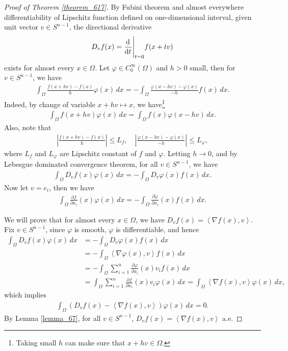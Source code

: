 \documentclass[11pt]{book}
\theoremstyle{definition}
\numberwithin{equation}{chapter}
\begin{document}
\begin{proof}[Proof of Theorem \ref{theorem_617}]
By Fubini theorem and almost everywhere differentiability of Lipschitz function defined on one-dimensional interval, given unit vector $v \in S^{n-1}$, the directional derivative \begin{align*}
    D_vf(x) = \dv[]{}{t} \Bigg|_{t=0} f(x + tv)
\end{align*}
exists for almost every $x \in \Omega$. Let $\varphi \in C^\infty_0(\Omega)$ and $h > 0$ small, then for $v \in S^{n-1}$, we have
\begin{align*}
    \int_{\Omega} \frac{f(x + hv) - f(x)}{h} \varphi(x) \,dx = - \int_{\Omega} \frac{\varphi(x - hv) - \varphi(x)}{-h} f(x) \,dx.
\end{align*}
Indeed, by change of variable $x + hv \mapsto x$, we have\footnote{Taking small $h$ can make sure that $x + hv \in \Omega$.}
\begin{align*}
    \int_{\Omega} f(x + hv) \varphi(x) \,dx = \int_{\Omega} f(x) \varphi(x-hv) \,dx.
\end{align*}
Also, note that
\begin{align*}
    \left|\frac{f(x + hv) - f(x)}{h}\right| \leq L_f, \quad \left|\frac{\varphi(x - hv) - \varphi(x)}{-h}\right| \leq L_\varphi,
\end{align*}
where $L_f$ and $L_\varphi$ are Lipschitz constant of $f$ and $\varphi$. Letting $h \to 0$, and by Lebesgue dominated convergence theorem, for all $v \in S^{n-1}$, we have
\begin{align*}
    \int_{\Omega} D_vf(x)\varphi(x) \,dx = - \int_{\Omega} D_v\varphi(x)f(x) \,dx.
\end{align*}
Now let $v = e_i$, then we have
\begin{align*}
    \int_{\Omega} \frac{\partial f}{\partial x_i}(x) \varphi(x) \,dx = - \int_{\Omega} \frac{\partial \varphi}{\partial x_i}(x) f(x) \,dx.
\end{align*}

We will prove that for almost every $x \in \Omega$, we have $D_vf(x) = \left\langle \nabla f(x), v \right\rangle$. Fix $v \in S^{n-1}$, since $\varphi$ is smooth, $\varphi$ is differentiable, and hence
\begin{align*}
    \int_{\Omega} D_vf(x)\varphi(x) \,dx & = - \int_{\Omega} D_v\varphi(x)f(x) \,dx \\
    & = - \int_{\Omega} \left\langle \nabla \varphi(x), v \right\rangle f(x) \,dx \\
    & = - \int_{\Omega} \sum^n_{i=1} \frac{\partial \varphi}{\partial x_i}(x) v_i f(x) \,dx \\
    & = \int_{\Omega} \sum^n_{i=1} \frac{\partial f}{\partial x_i}(x) v_i \varphi(x) \,dx = \int_{\Omega} \left\langle \nabla f(x), v \right\rangle \varphi(x) \,dx,
\end{align*}
which implies 
\begin{align*}
    \int_{\Omega} \left(D_vf(x) - \left\langle \nabla f(x), v \right\rangle \right)\varphi(x) \,dx = 0.
\end{align*}
By Lemma \ref{lemma_67}, for all $v \in S^{n-1}$, $D_vf(x) = \left\langle \nabla f(x), v \right\rangle$ a.e.


\end{proof}
\end{document}
